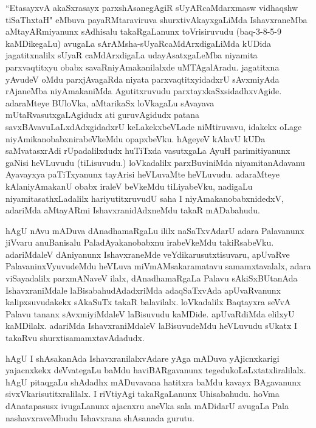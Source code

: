 
\begin{artha}
``EtasayxvA akaSxrasayx parxshAsanegAgiR sUyARcaMdarxmasw vidhaqshw tiSaThxtaH" eMbuva payaRMtaraviruva shurxtivAkayxgaLiMda IshavxraneMba aMtayARmiyanunx sAdhisalu takaRgaLanunx toVrisiruvudu (baq-3-8-5-9 kaMDikegaLu) avugaLa sArAMsha-sUyaRcaMdArxdigaLiMda kUDida jagatitxnalilx sUyaR caMdArxdigaLa udayAsatxgaLeMba niyamita parxvaqtitxyu obabx savaRniyAmakanilalxde uMTAgalAradu. jagatitxna yAvudeV oMdu parxjAvagaRda niyata parxvaqtitxyidadxrU sAvxmiyAda rAjaneMba niyAmakaniMda Agutitxruvudu parxtayxkaSxsidadhxvAgide. adaraMteye BUloVka, aMtarikaSx loVkagaLu sAvayava mUtaRvasutxgaLAgidudx ati guruvAgidudx patana savxBAvavuLaLxdAdxgidadxrU keLakekxbeVLade niMtiruvavu, idakekx oLage niyAmikanobabxnirabeVkeMdu opapxbeVku. hAgeyeV kAlavU kUDa saMvatasxrAdi rUpadalilxdudx huTiTxda vasutxgaLa AyuH parimitiyanunx gaNisi heVLuvudu (tiLisuvudu.) loVkadalilx parxBuviniMda niyamitanAdavanu Ayavayxya paTiTxyanunx tayArisi heVLuvaMte heVLuvudu. adaraMteye kAlaniyAmakanU obabx iraleV beVkeMdu tiLiyabeVku, nadigaLu niyamitasathxLadalilx hariyutitxruvudU saha I niyAmakanobabxnidedxV, adariMda aMtayARmi IshavxranidAdxneMdu takaR mADabahudu. 
\end{artha}

\begin{artha}
hAgU nAvu mADuva dAnadhamaRgaLu ililx naSaTxvAdarU adara Palavanunx jiVvaru anuBanisalu PaladAyakanobabxnu irabeVkeMdu takiRsabeVku. adariMdaleV dAniyanunx IshavxraneMde veYdikarusutxtisuvaru, apUvaRve PalavaninxVyuvudeMdu heVLuva miVmAMsakaramatavu samamxtavalalx, adara viSayadalilx parxmANaveV ilalx, dAnadhamaRgaLa Palavu sAkiSxBUtanAda IshavxraniMdale laBisabahudAdadxriMda adaqSaTxvAda apUvaRvanunx kalipxsuvudakekx sAkaSuTx takaR balavilalx. loVkadalilx Baqtayxra seVvA Palavu tananx sAvxmiyiMdaleV laBisuvudu kaMDide. apUvaRdiMda elilxyU kaMDilalx. adariMda IshavxraniMdaleV laBisuvudeMdu heVLuvudu sUkatx I takaRvu shurxtisamamxtavAdadudx.
\end{artha}%

\begin{artha}
hAgU I shAsakanAda IshavxranilalxvAdare yAga mADuva yAjicnxkarigi yajacnxkekx deVvategaLu baMdu haviBARgavanunx tegedukoLaLxtatxliralilalx. hAgU pitaqgaLu shAdadhx mADuvavana hatitxra baMdu kavayx BAgavanunx sivxVkarisutitxralilalx. I riVtiyAgi takaRgaLanunx Uhisabahudu. hoVma dAnatapasusx ivugaLanunx ajacnxru aneVka sala mADidarU avugaLa Pala nashavxraveMbudu Ishavxrana shAsanada gurutu. 
\end{artha}

